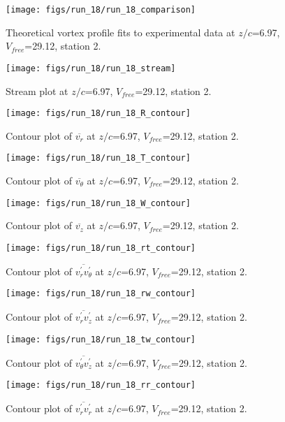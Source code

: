 \begin{figure}[H]
\centering
\texttt{[image: figs/run\_18/run\_18\_comparison]}
\caption{Theoretical vortex profile fits to experimental data at $z/c$=6.97, $V_{free}$=29.12, station 2.}
\end{figure}


\begin{figure}[H]
\centering
\texttt{[image: figs/run\_18/run\_18\_stream]}
\caption{Stream plot at $z/c$=6.97, $V_{free}$=29.12, station 2.}
\end{figure}


\begin{figure}[H]
\centering
\texttt{[image: figs/run\_18/run\_18\_R\_contour]}
\caption{Contour plot of $\overline{v_{r}}$ at $z/c$=6.97, $V_{free}$=29.12, station 2.}
\end{figure}


\begin{figure}[H]
\centering
\texttt{[image: figs/run\_18/run\_18\_T\_contour]}
\caption{Contour plot of $\overline{v_{\theta}}$ at $z/c$=6.97, $V_{free}$=29.12, station 2.}
\end{figure}


\begin{figure}[H]
\centering
\texttt{[image: figs/run\_18/run\_18\_W\_contour]}
\caption{Contour plot of $\overline{v_{z}}$ at $z/c$=6.97, $V_{free}$=29.12, station 2.}
\end{figure}


\begin{figure}[H]
\centering
\texttt{[image: figs/run\_18/run\_18\_rt\_contour]}
\caption{Contour plot of $\overline{v_{r}^{\prime} v_{\theta}^{\prime}}$ at $z/c$=6.97, $V_{free}$=29.12, station 2.}
\end{figure}


\begin{figure}[H]
\centering
\texttt{[image: figs/run\_18/run\_18\_rw\_contour]}
\caption{Contour plot of $\overline{v_{r}^{\prime} v_{z}^{\prime}}$ at $z/c$=6.97, $V_{free}$=29.12, station 2.}
\end{figure}


\begin{figure}[H]
\centering
\texttt{[image: figs/run\_18/run\_18\_tw\_contour]}
\caption{Contour plot of $\overline{v_{\theta}^{\prime} v_{z}^{\prime}}$ at $z/c$=6.97, $V_{free}$=29.12, station 2.}
\end{figure}


\begin{figure}[H]
\centering
\texttt{[image: figs/run\_18/run\_18\_rr\_contour]}
\caption{Contour plot of $\overline{v_{r}^{\prime} v_{r}^{\prime}}$ at $z/c$=6.97, $V_{free}$=29.12, station 2.}
\end{figure}


